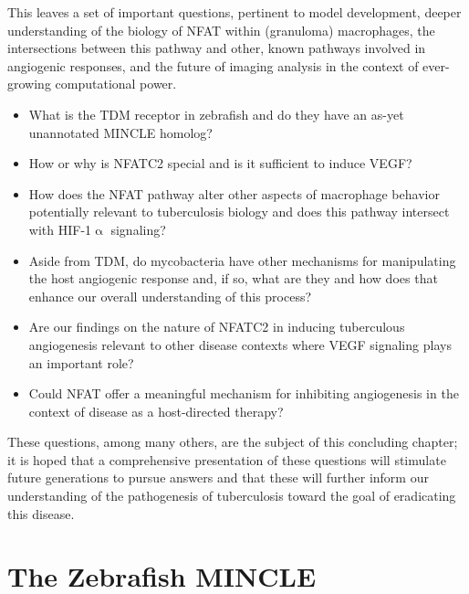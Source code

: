This leaves a set of important questions, pertinent to model development, deeper understanding of the biology of NFAT within (granuloma) macrophages, the intersections between this pathway and other, known pathways involved in angiogenic responses, and the future of imaging analysis in the context of ever-growing computational power. 

\begin{itemize}
\item What is the TDM receptor in zebrafish and do they have an as-yet unannotated MINCLE homolog? 
\item How or why is NFATC2 special and is it sufficient to induce VEGF? 
\item How does the NFAT pathway alter other aspects of macrophage behavior potentially relevant to tuberculosis biology and does this pathway intersect with HIF-1$\upalpha$ signaling? 
\item Aside from TDM, do mycobacteria have other mechanisms for manipulating the host angiogenic response and, if so, what are they and how does that enhance our overall understanding of this process? 
\item Are our findings on the nature of NFATC2 in inducing tuberculous angiogenesis relevant to other disease contexts where VEGF signaling plays an important role? 
\item Could NFAT offer a meaningful mechanism for inhibiting angiogenesis in the context of disease as a host-directed therapy?
\end{itemize}

These questions, among many others, are the subject of this concluding chapter; it is hoped that a comprehensive presentation of these questions will stimulate future generations to pursue answers and that these will further inform our understanding of the pathogenesis of tuberculosis toward the goal of eradicating this disease.

\section{The Zebrafish MINCLE}

